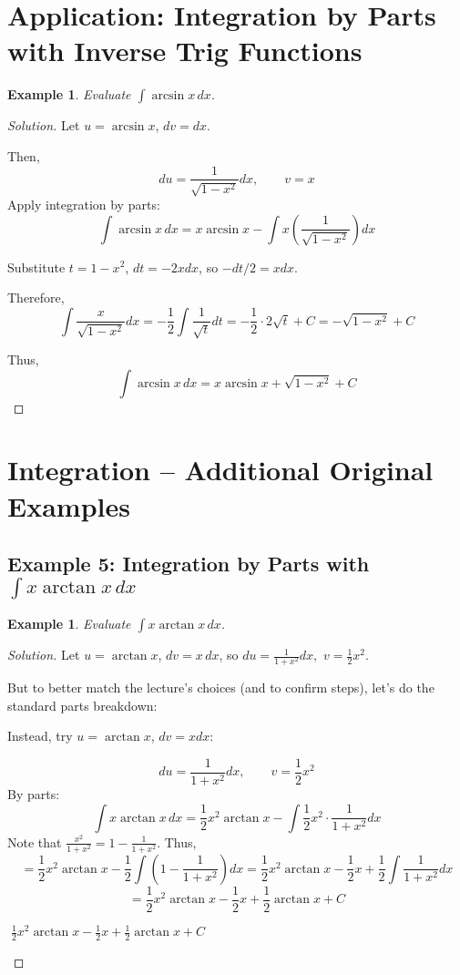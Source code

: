 \documentclass[11pt]{article}
\newtheorem{example}[definition]{Example}
\theoremstyle{definition}
\begin{document}
\section{Application: Integration by Parts with Inverse Trig Functions}

\begin{example}\label{ex:arcsin}
Evaluate $\displaystyle \int \arcsin x\, dx$.
\end{example}

\begin{proof}[Solution]
Let $u = \arcsin x$, $dv = dx$.

Then,
\[
du = \frac{1}{\sqrt{1-x^2}}dx, \qquad v = x
\]
Apply integration by parts:
\[
\int \arcsin x\, dx = x \arcsin x - \int x \left( \frac{1}{\sqrt{1- x^2}} \right ) dx
\]

Substitute $t = 1 - x^2$, $dt = -2x dx$, so $-dt/2 = x dx$.

Therefore,
\[
\int \frac{x}{\sqrt{1 - x^2}} dx = -\frac{1}{2} \int \frac{1}{\sqrt{t}} dt = -\frac{1}{2} \cdot 2 \sqrt{t} + C = -\sqrt{1 - x^2} + C
\]

Thus,
\[
\boxed{\int \arcsin x\, dx = x \arcsin x + \sqrt{1 - x^2} + C }
\]
\end{proof}

\section{Integration -- Additional Original Examples}

\subsection*{Example 5: Integration by Parts with $\int x \arctan x\, dx$}

\begin{example}
Evaluate $\displaystyle \int x \arctan x\, dx$.
\end{example}

\begin{proof}[Solution]
Let $u = \arctan x$, $dv = x\, dx$, so $du = \frac{1}{1 + x^2} dx,$ $v = \frac{1}{2} x^2$.

But to better match the lecture's choices (and to confirm steps), let's do the standard parts breakdown:

Instead, try $u = \arctan x$, $dv = x dx$:

\[
du = \frac{1}{1 + x^2} dx, \qquad v = \frac{1}{2} x^2
\]
By parts:
\[
\int x \arctan x\, dx = \frac{1}{2} x^2 \arctan x - \int \frac{1}{2} x^2 \cdot \frac{1}{1 + x^2} dx
\]
Note that $\frac{x^2}{1 + x^2} = 1 - \frac{1}{1 + x^2}$.
Thus,
\[
= \frac{1}{2} x^2 \arctan x - \frac{1}{2} \int \left ( 1 - \frac{1}{1 + x^2} \right ) dx
= \frac{1}{2} x^2 \arctan x - \frac{1}{2} x + \frac{1}{2} \int \frac{1}{1 + x^2} dx
\]
\[
= \frac{1}{2} x^2 \arctan x - \frac{1}{2} x + \frac{1}{2} \arctan x + C
\]

\begin{flushright}
    $\boxed{\; \frac{1}{2} x^2 \arctan x - \frac{1}{2} x + \frac{1}{2} \arctan x + C \;}$
\end{flushright}
\end{proof}
\end{document}
